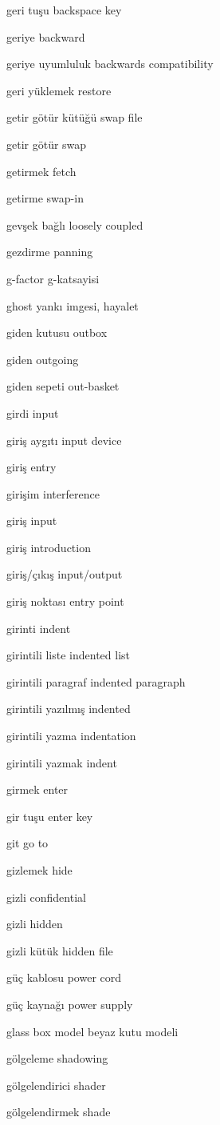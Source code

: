 \documentclass[12pt,fleqn]{article}\usepackage{../../common}
\begin{document}
geri tuşu backspace key

geriye backward

geriye uyumluluk backwards compatibility

geri yüklemek restore

getir götür kütüğü swap file

getir götür swap

getirmek fetch

getirme swap-in

gevşek bağlı loosely coupled

gezdirme panning

g-factor g-katsayisi

ghost yankı imgesi, hayalet

giden kutusu outbox

giden outgoing

giden sepeti out-basket

girdi input

giriş aygıtı input device

giriş entry

girişim interference

giriş input

giriş introduction

giriş/çıkış input/output

giriş noktası entry point

girinti indent

girintili liste indented list

girintili paragraf indented paragraph

girintili yazılmış indented

girintili yazma indentation

girintili yazmak indent

girmek enter

gir tuşu enter key

git go to

gizlemek hide

gizli confidential

gizli hidden

gizli kütük hidden file

güç kablosu power cord

güç kaynağı power supply

glass box model beyaz kutu modeli

gölgeleme shadowing

gölgelendirici shader

gölgelendirmek shade
\end{document}
